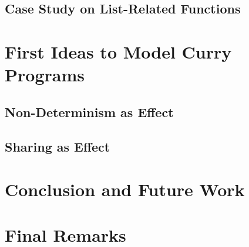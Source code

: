 \subsection{Case Study on List-Related Functions}

\section{First Ideas to Model Curry Programs}
\subsection{Non-Determinism as Effect}
\subsection{Sharing as Effect}

\section{Conclusion and Future Work}

\section{Final Remarks}
